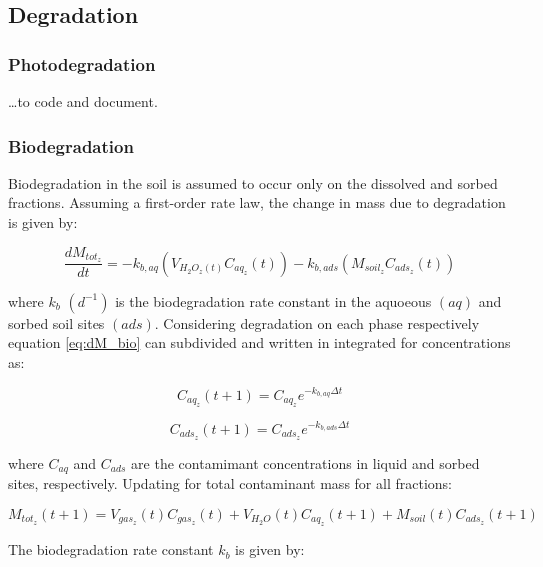 \documentclass[]{article}
\begin{document}
\subsection{Degradation}\label{degradation}

\subsubsection{Photodegradation}\label{photodegradation}

\ldots{}to code and document.

\subsubsection{Biodegradation}\label{biodegradation}

Biodegradation in the soil is assumed to occur only on the dissolved and
sorbed fractions. Assuming a first-order rate law, the change in mass
due to degradation is given by:

\begin{equation}
\frac{dM_{tot_z}}{dt} = -k_{b,aq}(V_{H_2O_z(t)}C_{aq_z}(t))-k_{b,ads}(M_{soil_z}C_{ads_z}(t))
\label{eq:dM_bio}
\end{equation}

where \(k_{b}\) \((d^{-1})\) is the biodegradation rate constant in the
aquoeous \((aq)\) and sorbed soil sites \((ads)\). Considering
degradation on each phase respectively equation \ref{eq:dM_bio} can
subdivided and written in integrated for concentrations as:

\begin{equation}
C_{aq_z}(t+1) = C_{aq_z}e^{-k_{b,aq} \Delta t} 
\label{eq:Maq_t1}
\end{equation}

\begin{equation}
C_{ads_z}(t+1) = C_{ads_z}e^{-k_{b,ads} \Delta t}
\label{eq:Mads_t1}
\end{equation}

where \(C_{aq}\) and \(C_{ads}\) are the contamimant concentrations in
liquid and sorbed sites, respectively. Updating for total contaminant
mass for all fractions:

\begin{equation}
M_{tot_z}(t+1) = V_{gas_z}(t)C_{gas_z}(t) + V_{H_2O}(t)C_{aq_z}(t+1) + M_{soil}(t)C_{ads_z}(t+1)
\label{eq:Mtot_t1}
\end{equation}

The biodegradation rate constant \(k_{b}\) is given by:
\end{document}

